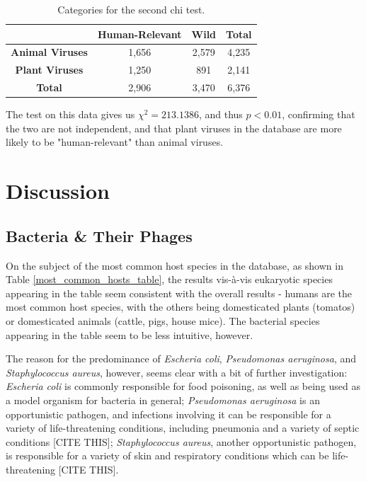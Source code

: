 \documentclass[12pt]{article}
\begin{document}
    \begin{table}[H]
        \begin{center}
            \begin{tabular}{|c|c|c|c|}
                \hline
                                        & \textbf{Human-Relevant} & \textbf{Wild} & \textbf{Total} \\ \hline
                \textbf{Animal Viruses} & 1,656                   & 2,579         & 4,235          \\ \hline
                \textbf{Plant Viruses}  & 1,250                   & 891           & 2,141          \\ \hline
                \textbf{Total}          & 2,906                   & 3,470         & 6,376          \\ \hline
            \end{tabular}
        \end{center}
        \caption{Categories for the second chi test.}
        \label{plants_animals_chi_test}
    \end{table}

    The test on this data gives us $\chi^2 = 213.1386$, and thus $p < 0.01$,
    confirming that the two are not independent, and that plant viruses in the
    database are more likely to be "human-relevant" than animal viruses.
        
    \section{Discussion}

    \subsection{Bacteria \& Their Phages}

    On the subject of the most common host species in the database, as shown in
    Table \ref{most_common_hosts_table}, the results vis-à-vis eukaryotic species
    appearing in the table seem consistent with the overall results - humans are
    the most common host species, with the others being domesticated plants
    (tomatos) or domesticated animals (cattle, pigs, house mice). The bacterial
    species appearing in the table seem to be less intuitive, however.

    The reason for the predominance of \emph{Escheria coli}, \emph{Pseudomonas
    aeruginosa}, and \emph{Staphylococcus aureus}, however, seems clear with
    a bit of further investigation: \emph{Escheria coli} is commonly responsible
    for food poisoning, as well as being used as a model organism for bacteria
    in general; \emph{Pseudomonas aeruginosa} is an opportunistic pathogen, and
    infections involving it can be responsible for a variety of life-threatening
    conditions, including pneumonia and a variety of septic conditions [CITE THIS];
    \emph{Staphylococcus aureus}, another opportunistic pathogen, is responsible
    for a variety of skin and respiratory conditions which can be life-threatening
    [CITE THIS].
\end{document}
